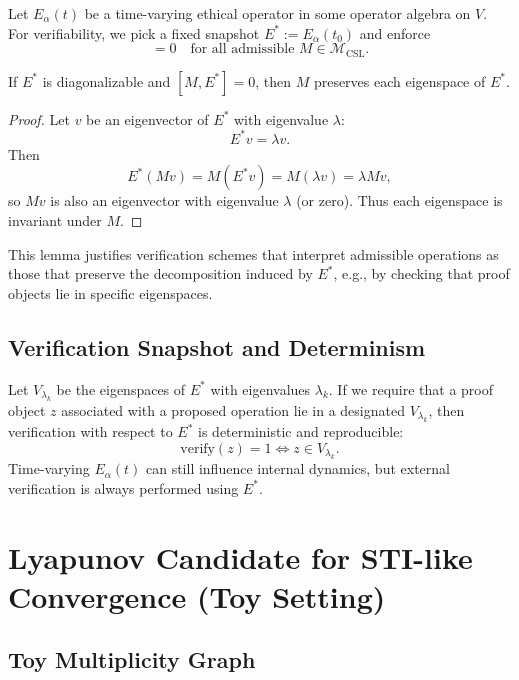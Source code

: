\documentclass[11pt]{article}
\begin{document}
Let $E_\alpha(t)$ be a time-varying ethical operator in some operator algebra on $V$.
For verifiability, we pick a fixed snapshot $E^* := E_\alpha(t_0)$ and enforce
\begin{equation}
  [M, E^*] = 0
  \quad\text{for all admissible } M \in \mathcal{M}_{\mathrm{CSL}}.
  \label{eq:snapshot-comm}
\end{equation}

\begin{lemma}
If $E^*$ is diagonalizable and $[M, E^*] = 0$, then $M$ preserves each eigenspace of $E^*$.
\end{lemma}

\begin{proof}
Let $v$ be an eigenvector of $E^*$ with eigenvalue $\lambda$:
\[
  E^* v = \lambda v.
\]
Then
\[
  E^* (M v)
  = M (E^* v)
  = M (\lambda v)
  = \lambda M v,
\]
so $M v$ is also an eigenvector with eigenvalue $\lambda$ (or zero).
Thus each eigenspace is invariant under $M$.
\end{proof}

This lemma justifies verification schemes that interpret admissible operations as those that preserve the decomposition induced by $E^*$, e.g., by checking that proof objects lie in specific eigenspaces.

\subsection{Verification Snapshot and Determinism}

Let $V_{\lambda_k}$ be the eigenspaces of $E^*$ with eigenvalues $\lambda_k$.
If we require that a proof object $z$ associated with a proposed operation lie in a designated $V_{\lambda_k}$, then verification with respect to $E^*$ is deterministic and reproducible:
\begin{equation}
  \text{verify}(z) = 1 \iff z \in V_{\lambda_k}.
\end{equation}
Time-varying $E_\alpha(t)$ can still influence internal dynamics, but external verification is always performed using $E^*$.

\section{Lyapunov Candidate for STI-like Convergence (Toy Setting)}

\subsection{Toy Multiplicity Graph}
\end{document}
